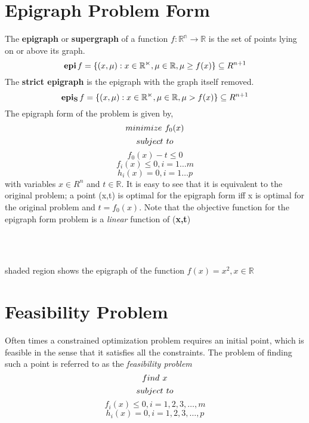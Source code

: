 \documentclass[twoside]{article}
\begin{document}
\section{Epigraph Problem Form}
The {\bf epigraph} or {\bf supergraph} of a function \(f : \mathbb{R^n} \rightarrow \mathbb{R}\) is the set of points lying on or above its graph.
\[{\bf epi}\hspace{0.5mm} f = \{(x,\mu) : x \in \mathbb{R^n}, \mu \in \mathbb{R}, \mu \geq f(x)\}\subseteq R^{n+1}\]
The {\bf strict epigraph} is the epigraph with the graph itself removed.
\[{\bf epi_S}\hspace{0.5mm}f = \{(x,\mu) : x \in \mathbb{R^n}, \mu \in \mathbb{R}, \mu > f(x)\}\subseteq R^{n+1}\]
The epigraph form of the problem is given by,
\[minimize\hspace*{0.05in}f_0(x)\]
\[subject \hspace*{0.05in}to\]
\[f_0(x) - t \leq 0\]
\[f_i(x) \leq 0, i = 1\ldots{m}\]
\[h_i(x) = 0, i = 1\ldots{p}\]
with variables \(x \in R^n\) and \(t \in \mathbb{R}\). It is easy to see that it is equivalent to the original problem; a point (x,t) is optimal for the epigraph form iff x is optimal for the original problem and \(t = f_0(x)\). Note that the objective function for the epigraph form problem is a {\it linear} function of ({\bf x,t}) \\
\\
\hspace{2in}\\
\begin{text}
   shaded region shows the epigraph of the function \bf \(f(x) = x^2 , x \in \mathbb{R} \)
\end{text}
\section{Feasibility Problem}
Often times a constrained optimization problem requires an initial point, which is feasible in the sense that it satisfies all the constraints. The problem of finding such a point is referred to as the {\it feasibility problem}
 \[find \hspace*{0.05in} x\]
 \[subject \hspace*{0.05in} to\]
 \[f_i(x) \leq 0, i = 1,2,3,\ldots,m\]
\[h_i(x) = 0, i = 1,2,3,\ldots,p\]
\end{document}
